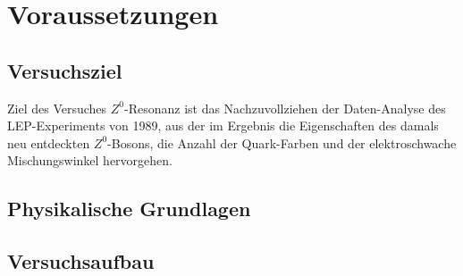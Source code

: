 \section{Voraussetzungen}

\subsection{Versuchsziel}

Ziel des Versuches $Z^0$-Resonanz ist das Nachzuvollziehen der Daten-Analyse des
LEP-Experiments von 1989, aus der im Ergebnis die Eigenschaften des damals neu
entdeckten $Z^0$-Bosons, die Anzahl der Quark-Farben und der elektroschwache
Mischungswinkel hervorgehen.

\subsection{Physikalische Grundlagen}

\subsection{Versuchsaufbau}